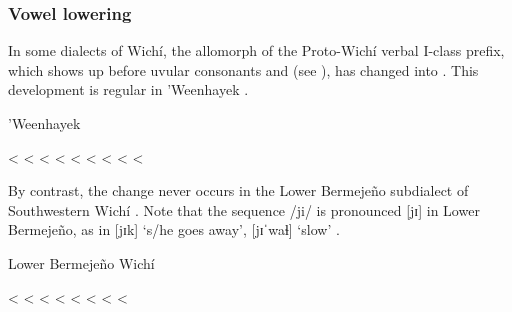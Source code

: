 \subsubsection{Vowel lowering}\label{wi-lowering}

In some dialects of Wichí, the allomorph  of the Proto-Wichí verbal I-class prefix, which shows up before uvular consonants and  (see ), has changed into . This development is regular in ’Weenhayek .

\ea
’Weenhayek \citep{KC16} \label{wi-lh-vl-whk}\\
    \begin{xlist}
        \ex {} < 
        \ex {} < 
        \ex {} < 
        \ex {} < 
        \ex {} < 
        \ex {} < 
        \ex {} < 
        \ex {} < 
        \ex {} < 
    \end{xlist}
\z

By contrast, the change never occurs in the Lower Bermejeño subdialect of Southwestern Wichí . Note that the sequence /ji/ is pronounced [jɪ] in Lower Bermejeño, as in [jɪk] `s/he goes away', [jɪˈwaɬ] `slow' \citep[41]{VN14}.

\ea
Lower Bermejeño Wichí \citep{VN14,JB09} \label{wi-lh-vl-lb}\\
    \begin{xlist}
        \ex {} < 
        \ex {} < 
        \ex {} < 
        \ex {} < 
        \ex {} < 
        \ex {} < 
        \ex {} < 
        \ex {} < 
    \end{xlist}
\z
{}

